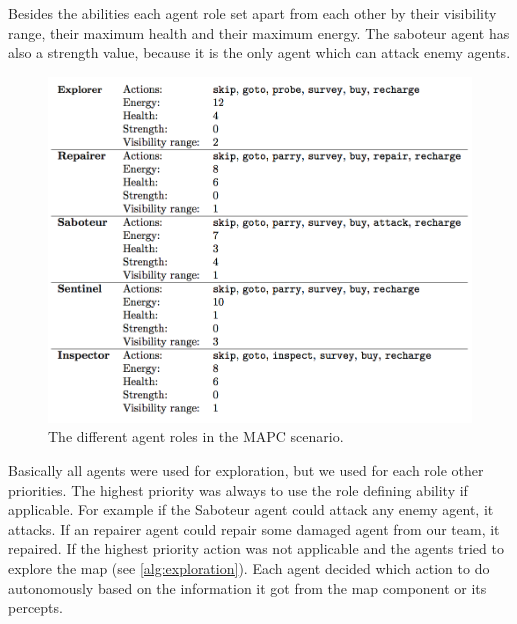Besides the abilities each agent role set apart from each other by their visibility range, their maximum health and their maximum energy. The saboteur agent has also a strength value, because it is the only agent which can attack enemy agents. 
\begin{figure}[ht]
  \centering
  \includegraphics[width=0.9\linewidth]{images/roles.png}
  \caption{The different agent roles in the MAPC scenario.}
  \label{fig:arc:roles}
\end{figure}

Basically all agents were used for exploration, but we used for each role other priorities. The highest priority was always to use the role defining ability if applicable. For example if the Saboteur agent could attack any enemy agent, it attacks. If an repairer agent could repair some damaged agent from our team, it repaired. If the highest priority action was not applicable and the agents tried to explore the map (see \autoref{alg:exploration}). Each agent decided which action to do autonomously based on the information it got from the map component or its percepts. 


